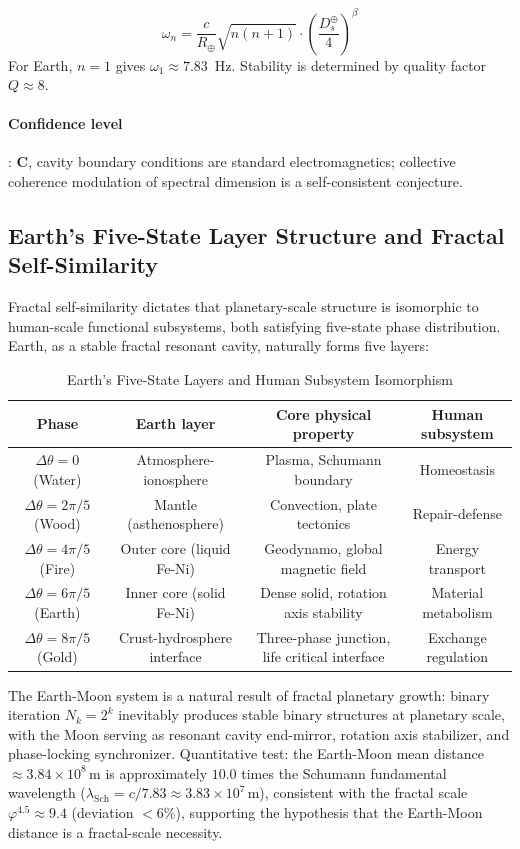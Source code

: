 \documentclass[12pt,a4paper,twocolumn]{article}
\renewcommand{\phi}{\varphi}
\begin{document}
\begin{equation}
\omega_n = \frac{c}{R_\oplus} \sqrt{n(n+1)} \cdot \left( \frac{D_s^\oplus}{4} \right)^\beta
\end{equation}
For Earth, $n=1$ gives $\omega_1\approx7.83$~Hz. Stability is determined by quality factor $Q\approx8$.

\paragraph{Confidence level}: \textbf{C}, cavity boundary conditions are standard electromagnetics; collective coherence modulation of spectral dimension is a self-consistent conjecture.


\subsection{Earth's Five-State Layer Structure and Fractal Self-Similarity}
\label{subsec:earth_moon_fractal}
Fractal self-similarity dictates that planetary-scale structure is isomorphic to human-scale functional subsystems, both satisfying five-state phase distribution. Earth, as a stable fractal resonant cavity, naturally forms five layers:

\begin{table}[H]
\centering
\footnotesize
\caption{Earth's Five-State Layers and Human Subsystem Isomorphism}
\begin{tabular}{c|c|c|c}
\hline
\textbf{Phase} & \textbf{Earth layer} & \textbf{Core physical property} & \textbf{Human subsystem} \\
\hline
$\Delta\theta=0$ (Water) & Atmosphere-ionosphere & Plasma, Schumann boundary & Homeostasis \\
$\Delta\theta=2\pi/5$ (Wood) & Mantle (asthenosphere) & Convection, plate tectonics & Repair-defense \\
$\Delta\theta=4\pi/5$ (Fire) & Outer core (liquid Fe-Ni) & Geodynamo, global magnetic field & Energy transport \\
$\Delta\theta=6\pi/5$ (Earth) & Inner core (solid Fe-Ni) & Dense solid, rotation axis stability & Material metabolism \\
$\Delta\theta=8\pi/5$ (Gold) & Crust-hydrosphere interface & Three-phase junction, life critical interface & Exchange regulation \\
\hline
\end{tabular}
\end{table}

The Earth-Moon system is a natural result of fractal planetary growth: binary iteration $N_k=2^k$ inevitably produces stable binary structures at planetary scale, with the Moon serving as resonant cavity end-mirror, rotation axis stabilizer, and phase-locking synchronizer. Quantitative test: the Earth-Moon mean distance $\approx 3.84\times10^8$\,m is approximately $10.0$ times the Schumann fundamental wavelength ($\lambda_{\text{Sch}}=c/7.83\approx3.83\times10^7$\,m), consistent with the fractal scale $\phi^{4.5}\approx9.4$ (deviation $<$6\%), supporting the hypothesis that the Earth-Moon distance is a fractal-scale necessity.
\end{document}
